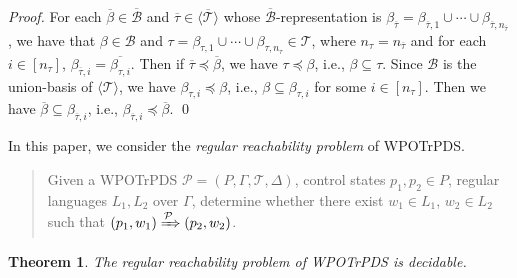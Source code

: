 \documentclass[preprint,12pt]{elsarticle}
\newtheorem{theorem}{Theorem}
\newcommand\Pp{{\mathcal{P} }}
\newcommand\TranSet{{\mathscr{T} }}
\newcommand\Tranbasis{{\mathscr{B} }}
\newcommand{\WOTrPDS}{\textsf{WPOTrPDS}}
\begin{document}
\begin{proof}
	For each $\overline{\beta} \in \overline{\Tranbasis}$ and $\overline{\tau} \in \langle \overline{\TranSet} \rangle$ whose $\overline{\Tranbasis}$-representation is $\beta_{\overline{\tau}}=\beta_{\overline{\tau}, 1} \cup \cdots \cup \beta_{\overline{\tau}, n_{\overline{\tau}}}$, we have that $\beta\in\Tranbasis$ and $\tau = \beta_{\tau,1}\cup \cdots \cup \beta_{\tau,n_\tau} \in \TranSet$, where $n_\tau = n_{\overline{\tau}}$ and for each $i\in[n_\tau]$, $\beta_{\overline{\tau}, i} = \overline{\beta_{\tau, i}}$.
	Then if $\overline{\tau}\preceq\overline{\beta}$, we have $\tau \preceq \beta$, i.e., $\beta\subseteq \tau$. Since $\Tranbasis$ is the union-basis of $\langle \TranSet \rangle$, we have $\beta_{\tau, i}\preceq \beta$, i.e., $\beta\subseteq\beta_{\tau, i}$ for some $i\in[n_\tau]$. Then we have $\overline{\beta}\subseteq \beta_{\overline{\tau}, i}$, i.e., $\beta_{\overline{\tau}, i} \preceq \overline{\beta}$.
	\qed

\end{proof}

In this paper, we consider the \emph{regular reachability problem} of {\WOTrPDS}.
\begin{quote} 
	Given a {\WOTrPDS} $\Pp = (P, \Gamma, \TranSet, \Delta)$, control states $p_1, p_2 \in P$, regular languages $L_1, L_2$ over $\Gamma$, determine whether there exist %
	$w_1 \in L_1$, $w_2 \in L_2$ such that $(p_1, w_1) \xRightarrow{\Pp} (p_2, w_2)$.
\end{quote}
%



\begin{theorem}\label{thm-wstrpds-reach}
The regular reachability problem of {\WOTrPDS} is decidable.
\end{theorem}
\end{document}
